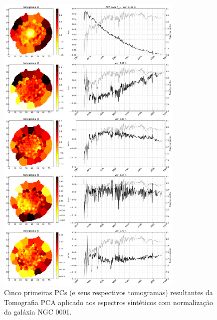 \begin{figure}
    \includegraphics[width=0.8\textwidth]{figuras/K0008-tomo-syn-norm.pdf}
    \caption[Tomogramas de 1 a 5 para o cubo $f_{syn}$ - NGC 0001.]
    {Cinco primeiras PCs (e seus respectivos tomogramas) resultantes da Tomografia PCA aplicado aos espectros
    sintéticos com normalização da galáxia NGC 0001.}
    \label{fig:K0008tomofsynnorm}
\end{figure}


